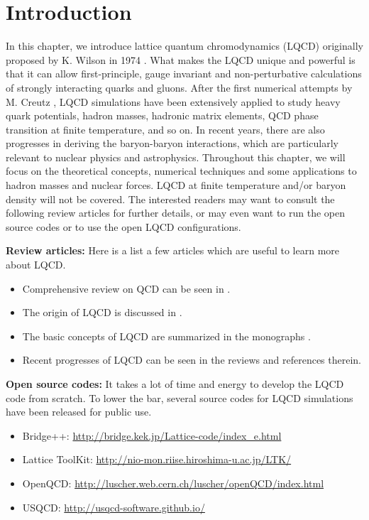 \section{Introduction}

In this chapter, we introduce  lattice quantum chromodynamics (LQCD) 
originally proposed by K. Wilson in 1974 \cite{Wilson:1974sk}. What makes the LQCD unique and powerful is that
it can allow first-principle,  gauge invariant and non-perturbative calculations of strongly interacting
quarks and gluons.  After the first numerical attempts by M. Creutz \cite{Creutz:1980zw},
 LQCD simulations have been extensively applied to study heavy quark potentials,
hadron masses,  hadronic matrix elements, QCD phase transition at finite temperature, 
and so on.  In recent years, there are also progresses 
in deriving the  baryon-baryon interactions, which are particularly relevant to 
nuclear physics and astrophysics. Throughout this chapter, we will focus on the theoretical concepts, numerical techniques and some
applications to hadron masses and nuclear forces.  LQCD at finite temperature and/or baryon density will
not be covered.  The interested readers may want to consult the  following review articles for further details, or may even 
want to run the open source codes or to use the open LQCD configurations.

\vspace{0.3cm}

 \noindent
 {\bf Review articles:}   Here is a list a few articles which are useful to learn more about LQCD.  
 \begin{itemize}
\item Comprehensive review on QCD can be seen in \cite{Brambilla:2014jmp}.
\item The origin of LQCD is discussed in \cite{Wilson:2004de}.
\item The basic concepts  of LQCD are summarized in the monographs \cite{Creutz:1984mg,Rothe:1992nt}.
 \item Recent progresses of LQCD can be seen in the reviews \cite{Hoelbling:2014uea,Ukawa:2015eka} and references therein. 
 \end{itemize}

\vspace{0.3cm}

 \noindent
 {\bf Open source codes:} 
 It takes a lot of time and energy to develop the LQCD code from scratch. To lower the bar,
 several source codes for LQCD simulations have been released for public use.
  \begin{itemize}
\item Bridge++: \url{http://bridge.kek.jp/Lattice-code/index_e.html}
\item Lattice ToolKit: \url{http://nio-mon.riise.hiroshima-u.ac.jp/LTK/}
\item OpenQCD: \url{http://luscher.web.cern.ch/luscher/openQCD/index.html}
\item USQCD: \url{http://usqcd-software.github.io/}
\end{itemize}


